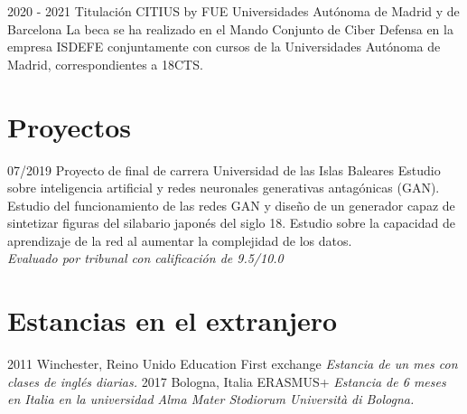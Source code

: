 \documentclass[]{friggeri-cv}
\begin{document}
\begin{entrylist}
  \entry
    {2020 - 2021}
    {Titulación CITIUS by FUE}
    {Universidades Autónoma de Madrid y de Barcelona}
    {
    La beca se ha realizado en el Mando Conjunto de Ciber Defensa en la empresa ISDEFE conjuntamente con cursos de la Universidades Autónoma de Madrid, correspondientes a 18CTS. }
\end{entrylist}


\section{Proyectos}
\begin{entrylist}
  \entry
    {07/2019}
    {Proyecto de final de carrera}
    {Universidad de las Islas Baleares}
    {Estudio sobre inteligencia artificial y redes neuronales generativas antagónicas (GAN). Estudio del funcionamiento de las redes GAN y diseño de un generador capaz de sintetizar figuras del silabario japonés del siglo 18. Estudio sobre la capacidad de aprendizaje de la red al aumentar la complejidad de los datos. \\
    \emph{Evaluado por tribunal con calificación de 9.5/10.0}}
\end{entrylist}

\section{Estancias en el extranjero}
\begin{entrylist}
  \entry
    {2011}
    {Winchester, Reino Unido}
    {Education First exchange}
    {\emph{Estancia de un mes con clases de inglés diarias.}}
  \entry
    {2017}
    {Bologna, Italia}
    {ERASMUS+}
    {\emph{Estancia de 6 meses en Italia en la universidad Alma Mater Stodiorum Università di Bologna.}}
\end{entrylist}

\end{document}
